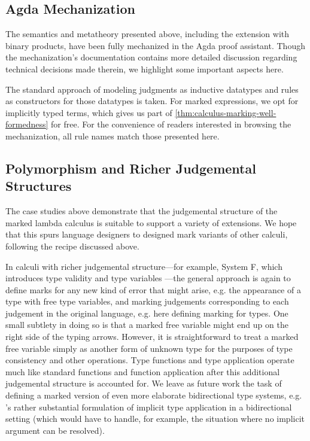 




\subsection{Agda Mechanization}
\label{sec:calculus-agda}

The semantics and metatheory presented above, including the extension with binary products, have
been fully mechanized in the Agda proof assistant. Though the mechanization's documentation contains
more detailed discussion regarding technical decisions made therein, we highlight some important
aspects here.

The standard approach of modeling judgments as inductive datatypes and rules as constructors for
those datatypes is taken. For marked expressions, we opt for implicitly typed terms,
which gives us part of \cref{thm:calculus-marking-well-formedness} for free. For the convenience of
readers interested in browsing the mechanization, all rule names match those presented here.

\subsection{Polymorphism and Richer Judgemental Structures}
\label{sec:calculus-poly}

The case studies above demonstrate that the judgemental structure of the marked lambda calculus is suitable to support a variety of extensions. We hope that this spurs language designers to designed mark variants of other calculi, following the recipe discussed above.

In calculi with richer judgemental structure---for example, System F, which introduces type validity and type variables \cite{tapl}---the general approach is again to define marks for any new kind of error that might arise, e.g. the appearance of a type with free type variables, and marking judgements corresponding to each judgement in the original language, e.g. here defining marking for types. One small subtlety in doing so is that a marked free variable might end up on the right side of the typing arrows. However, it is straightforward to treat a marked free variable simply as another form of unknown type for the purposes of type consistency and other operations. Type functions and type application operate much like standard functions and function application after this additional judgemental structure is accounted for.
We leave as future work the task of defining a marked version of even more elaborate bidirectional type systems, e.g. \citet{dunfield13}'s rather substantial formulation of implicit type application in a bidirectional setting (which would have to handle, for example, the situation where no implicit argument can be resolved).


